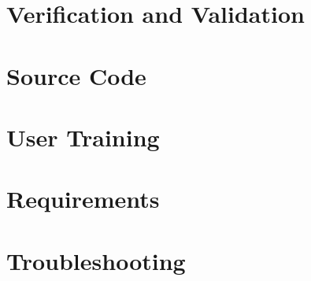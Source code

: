 \documentclass{simcenterdocumentation}
\begin{document}
\chapter{Verification and Validation}
\label{chap:vnv}


\chapter{Source Code}
\label{chap:SourceCode}


\chapter{User Training}
\label{chap:training}


\chapter{Requirements}
\label{chap:requirements}


\chapter{Troubleshooting}
\label{chap:troubleshooting}




\pagestyle{plain}
{
  \renewcommand{\thispagestyle}[1]{}	
  \printbibliography           
}
\end{document}
